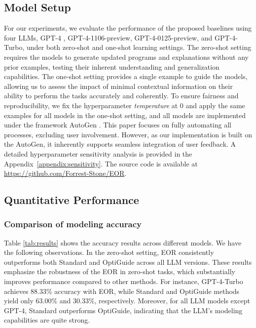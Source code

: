 \subsection{Model Setup}
For our experiments, we evaluate the performance of the proposed baselines using four LLMs, GPT-4 \citep{achiam2023gpt}, GPT-4-1106-preview, GPT-4-0125-preview, and GPT-4-Turbo, under both zero-shot and one-shot learning settings. The zero-shot setting requires the models to generate updated programs and explanations without any prior examples, testing their inherent understanding and generalization capabilities. The one-shot setting provides a single example to guide the models, allowing us to assess the impact of minimal contextual information on their ability to perform the tasks accurately and coherently.
To ensure fairness and reproducibility, we fix the hyperparameter \textit{temperature} at 0 and apply the same examples for all models in the one-shot setting, and all models are implemented under the framework AutoGen \citep{wu2024autogen}. This paper focuses on fully automating all processes, excluding user involvement. However, as our implementation is built on the AutoGen, it inherently supports seamless integration of user feedback. A detailed hyperparameter sensitivity analysis is provided in the Appendix~\ref{appendix:sensitivity}. The source code is available at \url{https://github.com/Forrest-Stone/EOR}.

\subsection{Quantitative Performance}

\subsubsection{Comparison of modeling accuracy}
Table \ref{tab:results} shows the accuracy results across different models. We have the following observations. In the zero-shot setting, EOR consistently outperforms both Standard and OptiGuide across all LLM versions. These results emphasize the robustness of the EOR in zero-shot tasks, which substantially improves performance compared to other methods. For instance, GPT-4-Turbo achieves 88.33\% accuracy with EOR, while Standard and OptiGuide methods yield only 63.00\% and 30.33\%, respectively. Moreover, for all LLM models except GPT-4, Standard outperforms OptiGuide, indicating that the LLM's modeling capabilities are quite strong.

